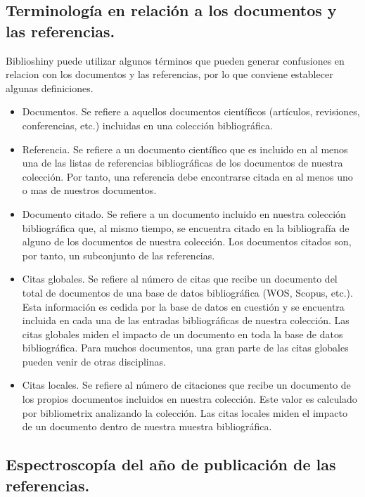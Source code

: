 \documentclass[
]{article}
\begin{document}
\hypertarget{terminologuxeda-en-relaciuxf3n-a-los-documentos-y-las-referencias.}{%
\subsection{Terminología en relación a los documentos y las
referencias.}\label{terminologuxeda-en-relaciuxf3n-a-los-documentos-y-las-referencias.}}

Biblioshiny puede utilizar algunos términos que pueden generar
confusiones en relacion con los documentos y las referencias, por lo que
conviene establecer algunas definiciones.

\begin{itemize}
\item
  Documentos. Se refiere a aquellos documentos científicos (artículos,
  revisiones, conferencias, etc.) incluidas en una colección
  bibliográfica.
\item
  Referencia. Se refiere a un documento científico que es incluido en al
  menos una de las listas de referencias bibliográficas de los
  documentos de nuestra colección. Por tanto, una referencia debe
  encontrarse citada en al menos uno o mas de nuestros documentos.
\item
  Documento citado. Se refiere a un documento incluido en nuestra
  colección bibliográfica que, al mismo tiempo, se encuentra citado en
  la bibliografía de alguno de los documentos de nuestra colección. Los
  documentos citados son, por tanto, un subconjunto de las referencias.
\item
  Citas globales. Se refiere al número de citas que recibe un documento
  del total de documentos de una base de datos bibliográfica (WOS,
  Scopus, etc.). Esta información es cedida por la base de datos en
  cuestión y se encuentra incluida en cada una de las entradas
  bibliográficas de nuestra colección. Las citas globales miden el
  impacto de un documento en toda la base de datos bibliográfica. Para
  muchos documentos, una gran parte de las citas globales pueden venir
  de otras disciplinas.
\item
  Citas locales. Se refiere al número de citaciones que recibe un
  documento de los propios documentos incluidos en nuestra colección.
  Este valor es calculado por bibliometrix analizando la colección. Las
  citas locales miden el impacto de un documento dentro de nuestra
  muestra bibliográfica.
\end{itemize}

\hypertarget{espectroscopuxeda-del-auxf1o-de-publicaciuxf3n-de-las-referencias.}{%
\subsection{Espectroscopía del año de publicación de las
referencias.}\label{espectroscopuxeda-del-auxf1o-de-publicaciuxf3n-de-las-referencias.}}
\end{document}
